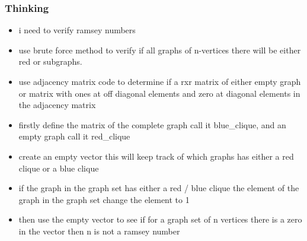 \documentclass{Assignment}
\begin{document}
\subsubsection*{Thinking}
\underline{}
\begin{itemize}
	\item i need to verify ramsey numbers
	\item use brute force method to verify if all graphs of n-vertices there will be either red or subgraphs. 
	\item use adjacency matrix code to determine if a rxr matrix of either empty graph or matrix with ones at off diagonal elements and zero at diagonal elements in the adjacency matrix
	\item firstly define the matrix of the complete graph call it blue\_clique, and an empty graph call it red\_clique
	\item create an empty vector this will keep track of which graphs has either a red clique or a blue clique
	\item if the graph in the graph set has either a red / blue clique the element of the graph in the graph set change the element to 1
	\item then use the empty vector to see if for a graph set of n vertices there is a zero in the vector then n is not a ramsey number
\end{itemize}
\end{document}
